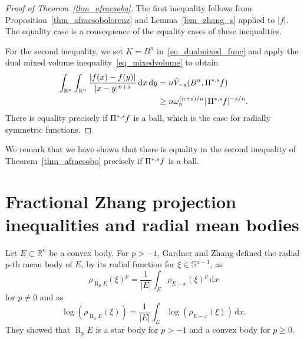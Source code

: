 \documentclass{amsart}
\newcommand{\ofpp}[1]{\operatorname{\Pi^{\ast,{\it #1}}}\!}
\newcommand{\omr}[1]{\operatorname{R}_{#1}}
\newcommand{\Bvtex}{{B^n}}
\newcommand{\snvtex}{{\mathbb S}^{n-1}}
\newcommand{\dvtex}{\,\mathrm{d}}
\newcommand{\vol}[1]{ \vert #1\vert}
\begin{document}
\begin{proof}[Proof of Theorem~\ref{thm_afracsobo}]
The first inequality follows from Proposition~\ref{thm_afracsobolorenz} and Lemma~\ref{lem_zhang_s} applied to
$|f|$. The equality case is a consequence of the equality cases of these
inequalities.


For the second inequality, we set $K=\Bvtex $ in~\eqref{eq_dualmixed_func} and apply the dual mixed volume inequality~\eqref{eq_mixedvolume} to obtain
%
\begin{align}
\int _{\mathbb R^{n}}\int _{\mathbb R^{n}}
\frac{\vert f(x)-f(y)\vert}{\vert x-y\vert ^{n+s}}\dvtex x\dvtex y &= n
\tilde V_{-s}(\Bvtex , \ofpp sf)
\nonumber \\
&\geq n \omega _{n}^{( {n+s})/n} \vol{\ofpp sf}^{-s/n}.
\nonumber \end{align}
%
There is equality precisely if $\ofpp sf$ is a ball, which is the case
for radially symmetric functions.
\end{proof}

We remark that we have shown that there is equality in the second inequality
of Theorem~\ref{thm_afracsobo} precisely if $\ofpp sf$ is a ball.

\goodbreak

\section{Fractional Zhang projection inequalities and radial mean bodies}
\label{sec_GZ}

Let $E\subset \mathbb R^{n}$ be a convex body. For $p>-1$, Gardner and
Zhang \cite{GZ} defined the radial $p$-th mean body of $E$, by its radial
function for $\xi \in \snvtex $, as
%
\begin{equation*}
\rho _{\omr p E}(\xi )^{p} = \frac {1}{\vol{E}}\int _{E} \rho _{E-x}(
\xi )^{p} \dvtex x
\end{equation*}
%
for $p\ne 0$ and as
%
\begin{equation*}
\log (\rho _{\omr 0 E}(\xi )) = \frac {1}{\vol{E}}\int _{E} \log (
\rho _{E-x}(\xi )) \dvtex x.
\end{equation*}
%
They showed that $\omr p E$ is a star body for $p>-1$ and a convex body
for $p\ge 0$.
\end{document}
